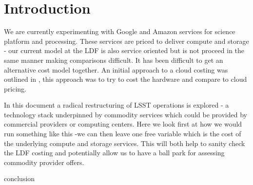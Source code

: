 \section{Introduction} \label{sec:intro}

We are currently experimenting with Google and Amazon services for science platform and processing.
These services are priced to deliver compute and storage - our current model at the LDF is also service oriented but
is not proceed in the same manner making comparisons difficult. It has been difficult to get an alternative cost model
together. An initial approach to a cloud costing was outlined in , this approach was to try to cost the hardware and compare to cloud pricing.

In this document a radical restructuring of LSST operations is explored - a technology stack underpinned by commodity services which could be provided by commercial providers or computing centers. Here we look first at how we would run something like this -we can then leave one free variable which is the cost of the underlying compute and storage services. This will both help to
sanity check the LDF costing and potentially allow us to have a ball park for assessing commodity provider offers.







 {conclusion}
